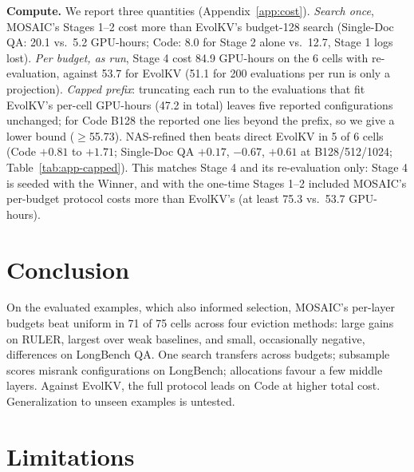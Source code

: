 \documentclass[11pt]{article}
\begin{document}
\textbf{Compute.} We report three quantities (Appendix~\ref{app:cost}). \emph{Search once}, MOSAIC's Stages 1--2 cost more than EvolKV's budget-128 search (Single-Doc QA: 20.1 vs.\ 5.2 GPU-hours; Code: 8.0 for Stage 2 alone vs.\ 12.7, Stage 1 logs lost). \emph{Per budget, as run}, Stage 4 cost 84.9 GPU-hours on the 6 cells with re-evaluation, against 53.7 for EvolKV (51.1 for 200 evaluations per run is only a projection). \emph{Capped prefix}: truncating each run to the evaluations that fit EvolKV's per-cell GPU-hours (47.2 in total) leaves five reported configurations unchanged; for Code B128 the reported one lies beyond the prefix, so we give a lower bound ($\geq$55.73). NAS-refined then beats direct EvolKV in 5 of 6 cells (Code $+0.81$ to $+1.71$; Single-Doc QA $+0.17$, $-0.67$, $+0.61$ at B128/512/1024; Table~\ref{tab:app-capped}). This matches Stage 4 and its re-evaluation only: Stage 4 is seeded with the Winner, and with the one-time Stages 1--2 included MOSAIC's per-budget protocol costs more than EvolKV's (at least 75.3 vs.\ 53.7 GPU-hours).

\section{Conclusion}

On the evaluated examples, which also informed selection, MOSAIC's per-layer budgets beat uniform in 71 of 75 cells across four eviction methods: large gains on RULER, largest over weak baselines, and small, occasionally negative, differences on LongBench QA. One search transfers across budgets; subsample scores misrank configurations on LongBench; allocations favour a few middle layers. Against EvolKV, the full protocol leads on Code at higher total cost. Generalization to unseen examples is untested.

\section*{Limitations}
\end{document}
